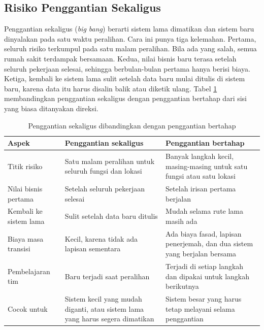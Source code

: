 \subsection{Risiko Penggantian Sekaligus}

Penggantian sekaligus (\textit{big bang}) berarti sistem lama dimatikan dan sistem baru dinyalakan
pada satu waktu peralihan. Cara ini punya tiga kelemahan. Pertama, seluruh risiko terkumpul pada
satu malam peralihan. Bila ada yang salah, semua rumah sakit terdampak bersamaan. Kedua, nilai
bisnis baru terasa setelah seluruh pekerjaan selesai, sehingga berbulan-bulan pertama hanya berisi
biaya. Ketiga, kembali ke sistem lama sulit setelah data baru mulai ditulis di sistem baru, karena
data itu harus disalin balik atau diketik ulang. Tabel \ref{tab:ch14-sekaligus-bertahap}
membandingkan penggantian sekaligus dengan penggantian bertahap dari sisi yang biasa ditanyakan
direksi.

\begin{table}[!htb]
  \centering
  \caption{Penggantian sekaligus dibandingkan dengan penggantian bertahap}
  \label{tab:ch14-sekaligus-bertahap}
  \footnotesize
  \begin{tabularx}{\textwidth}{>{\raggedright\arraybackslash}p{2.6cm}
      >{\raggedright\arraybackslash}X >{\raggedright\arraybackslash}X}
    \hline
    \textbf{Aspek} & \textbf{Penggantian sekaligus} & \textbf{Penggantian bertahap} \\ \hline
    Titik risiko & Satu malam peralihan untuk seluruh fungsi dan lokasi & Banyak langkah kecil,
      masing-masing untuk satu fungsi atau satu lokasi \\ \hline
    Nilai bisnis pertama & Setelah seluruh pekerjaan selesai & Setelah irisan pertama berjalan \\
      \hline
    Kembali ke sistem lama & Sulit setelah data baru ditulis & Mudah selama rute lama masih ada \\
      \hline
    Biaya masa transisi & Kecil, karena tidak ada lapisan sementara & Ada biaya fasad, lapisan
      penerjemah, dan dua sistem yang berjalan bersama \\ \hline
    Pembelajaran tim & Baru terjadi saat peralihan & Terjadi di setiap langkah dan dipakai untuk
      langkah berikutnya \\ \hline
    Cocok untuk & Sistem kecil yang mudah diganti, atau sistem lama yang harus segera dimatikan &
      Sistem besar yang harus tetap melayani selama penggantian \\ \hline
  \end{tabularx}
\end{table}

